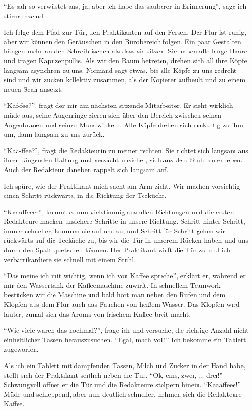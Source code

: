 \documentclass[final]{multiversum}
\begin{document}
\enquote{Es sah so verwüstet aus, ja, aber ich habe das sauberer in Erinnerung}, sage ich stirnrunzelnd.

Ich folge dem Pfad zur Tür, den Praktikanten auf den Fersen.
Der Flur ist ruhig, aber wir können den Geräuschen in den Bürobereich folgen.
Ein paar Gestalten hängen mehr an den Schreibtischen als dass sie sitzen.
Sie haben alle lange Haare und tragen Kapuzenpullis.
Als wir den Raum betreten, drehen sich all ihre Köpfe langsam asynchron zu uns.
Niemand sagt etwas, bis alle Köpfe zu uns gedreht sind und wir zucken kollektiv zusammen, als der Kopierer aufheult und zu einem neuen Scan ansetzt.

\enquote{Kaf-fee?}, fragt der mir am nächsten sitzende Mitarbeiter.
Er sieht wirklich müde aus, seine Augenringe zieren sich über den Bereich zwischen seinen Augenbrauen und seinen Mundwinkeln.
Alle Köpfe drehen sich ruckartig zu ihm um, dann langsam zu uns zurück.

\enquote{Kaa-ffee?}, fragt die Redakteurin zu meiner rechten.
Sie richtet sich langsam aus ihrer hängenden Haltung und versucht unsicher, sich aus dem Stuhl zu erheben.
Auch der Redakteur daneben rappelt sich langsam auf.

Ich spüre, wie der Praktikant mich sacht am Arm zieht.
Wir machen vorsichtig einen Schritt rückwärts, in die Richtung der Teeküche.

\enquote{Kaaaffeeee}, kommt es nun vielstimmig aus allen Richtungen und die ersten Redakteure machen unsichere Schritte in unsere Richtung.
Schritt hinter Schritt, immer schneller, kommen sie auf uns zu, und Schritt für Schritt gehen wir rückwärts auf die Teeküche zu, bis wir die Tür in unserem Rücken haben und uns durch den Spalt quetschen können.
Der Praktikant wirft die Tür zu und ich verbarrikardiere sie schnell mit einem Stuhl.

\enquote{Das meine ich mit wichtig, wenn ich von Kaffee spreche}, erklärt er, während er mir den Wassertank der Kaffeemaschine zuwirft.
In schnellem Teamwork bestücken wir die Maschine und bald hört man neben den Rufen und dem Klopfen aus dem Flur auch das Fauchen von heißem Wasser.
Das Klopfen wird lauter, zumal sich das Aroma von frischem Kaffee breit macht.

\enquote{Wie viele waren das nochmal?}, frage ich und versuche, die richtige Anzahl nicht einheitlicher Tassen herauszusuchen.
\enquote{Egal, mach voll!}
Ich bekomme ein Tablett zugeworfen.

Als ich ein Tablett mit dampfenden Tassen, Milch und Zucker in der Hand habe, stellt sich der Praktikant seitlich neben die Tür.
\enquote{Ok, eins, zwei, $\dots$ drei!}
Schwungvoll öffnet er die Tür und die Redakteure stolpern hinein.
\enquote{Kaaaffeee!}
Müde und schleppend, aber nun deutlich schneller, nehmen sich die Redakteure Kaffee.
\end{document}
